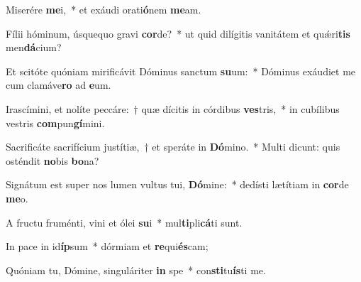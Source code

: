\item Miserére \textbf{me}i,~* et exáudi orati\textbf{ó}nem \textbf{me}am.
\item Fílii hóminum, úsquequo gravi \textbf{cor}de?~* ut quid dilígitis vanitátem et quǽri\textbf{tis} men\textbf{dá}cium?
\item Et scitóte quóniam mirificávit Dóminus sanctum \textbf{su}um:~* Dóminus exáudiet me cum clamáve\textbf{ro} ad \textbf{e}um.
\item Irascímini, et nolíte peccáre:~† quæ dícitis in córdibus \textbf{ves}tris,~* in cubílibus vestris \textbf{com}pun\textbf{gí}mini.
\item Sacrificáte sacrifícium justítiæ,~† et speráte in \textbf{Dó}mino.~* Multi dicunt: quis osténdit \textbf{no}bis \textbf{bo}na?
\item Signátum est super nos lumen vultus tui, \textbf{Dó}mine:~* dedísti lætítiam in \textbf{cor}de \textbf{me}o.
\item A fructu fruménti, vini et ólei \textbf{su}i~* mul\textbf{ti}pli\textbf{cá}ti sunt.
\item In pace in id\textbf{íp}sum~* dórmiam et \textbf{re}qui\textbf{és}cam;
\item Quóniam tu, Dómine, singuláriter \textbf{in} spe~* con\textbf{sti}tu\textbf{ís}ti me.
